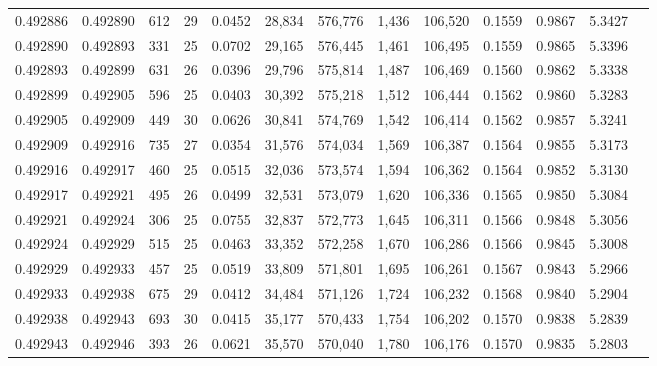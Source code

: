 \begin{tabular}{rrrrrrrrrrrrr}
0.492886 & 0.492890 & 612 &  29 &                                     0.0452 &  28,834 & 576,776 &   1,436 & 106,520 & 0.1559 & 0.9867 & 5.3427 \\
0.492890 & 0.492893 & 331 &  25 &                                     0.0702 &  29,165 & 576,445 &   1,461 & 106,495 & 0.1559 & 0.9865 & 5.3396 \\
0.492893 & 0.492899 & 631 &  26 &                                     0.0396 &  29,796 & 575,814 &   1,487 & 106,469 & 0.1560 & 0.9862 & 5.3338 \\
0.492899 & 0.492905 & 596 &  25 &                                     0.0403 &  30,392 & 575,218 &   1,512 & 106,444 & 0.1562 & 0.9860 & 5.3283 \\
0.492905 & 0.492909 & 449 &  30 &                                     0.0626 &  30,841 & 574,769 &   1,542 & 106,414 & 0.1562 & 0.9857 & 5.3241 \\
0.492909 & 0.492916 & 735 &  27 &                                     0.0354 &  31,576 & 574,034 &   1,569 & 106,387 & 0.1564 & 0.9855 & 5.3173 \\
0.492916 & 0.492917 & 460 &  25 &                                     0.0515 &  32,036 & 573,574 &   1,594 & 106,362 & 0.1564 & 0.9852 & 5.3130 \\
0.492917 & 0.492921 & 495 &  26 &                                     0.0499 &  32,531 & 573,079 &   1,620 & 106,336 & 0.1565 & 0.9850 & 5.3084 \\
0.492921 & 0.492924 & 306 &  25 &                                     0.0755 &  32,837 & 572,773 &   1,645 & 106,311 & 0.1566 & 0.9848 & 5.3056 \\
0.492924 & 0.492929 & 515 &  25 &                                     0.0463 &  33,352 & 572,258 &   1,670 & 106,286 & 0.1566 & 0.9845 & 5.3008 \\
0.492929 & 0.492933 & 457 &  25 &                                     0.0519 &  33,809 & 571,801 &   1,695 & 106,261 & 0.1567 & 0.9843 & 5.2966 \\
0.492933 & 0.492938 & 675 &  29 &                                     0.0412 &  34,484 & 571,126 &   1,724 & 106,232 & 0.1568 & 0.9840 & 5.2904 \\
0.492938 & 0.492943 & 693 &  30 &                                     0.0415 &  35,177 & 570,433 &   1,754 & 106,202 & 0.1570 & 0.9838 & 5.2839 \\
0.492943 & 0.492946 & 393 &  26 &                                     0.0621 &  35,570 & 570,040 &   1,780 & 106,176 & 0.1570 & 0.9835 & 5.2803 \\

\end{tabular}
